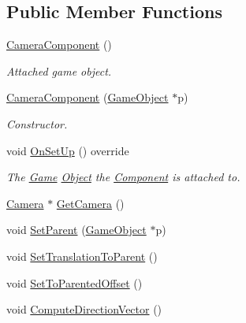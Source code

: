 \subsection*{Public Member Functions}
\begin{DoxyCompactItemize}
\item 
\hypertarget{class_camera_component_a6f14fb3dfa5ca8cfbaae2936413837d8}{\hyperlink{class_camera_component_a6f14fb3dfa5ca8cfbaae2936413837d8}{Camera\+Component} ()}\label{class_camera_component_a6f14fb3dfa5ca8cfbaae2936413837d8}

\begin{DoxyCompactList}\small\item\em Attached game object. \end{DoxyCompactList}\item 
\hyperlink{class_camera_component_ac13478a138aae597e2a2383a23809993}{Camera\+Component} (\hyperlink{class_game_object}{Game\+Object} $\ast$p)
\begin{DoxyCompactList}\small\item\em Constructor. \end{DoxyCompactList}\item 
void \hyperlink{class_camera_component_acd54d4b23d9005e9774f1c18e5a770f4}{On\+Set\+Up} () override
\begin{DoxyCompactList}\small\item\em The \hyperlink{class_game}{Game} \hyperlink{class_object}{Object} the \hyperlink{class_component}{Component} is attached to. \end{DoxyCompactList}\item 
\hyperlink{class_camera}{Camera} $\ast$ \hyperlink{class_camera_component_a1dfd5d80dc742c0f5b4ffdee800ef65c}{Get\+Camera} ()
\item 
void \hyperlink{class_camera_component_a7c539add4157eec66586dd6f9c8e6484}{Set\+Parent} (\hyperlink{class_game_object}{Game\+Object} $\ast$p)
\item 
void \hyperlink{class_camera_component_aa0d12f5b387e651246a0679669501440}{Set\+Translation\+To\+Parent} ()
\item 
void \hyperlink{class_camera_component_a0fea5ba248b0d18b9c412429092504b6}{Set\+To\+Parented\+Offset} ()
\item 
\hypertarget{class_camera_component_a09c8c13788174831d14f6b600da0aa73}{void \hyperlink{class_camera_component_a09c8c13788174831d14f6b600da0aa73}{Compute\+Direction\+Vector} ()}\label{class_camera_component_a09c8c13788174831d14f6b600da0aa73}


\end{DoxyCompactItemize}
